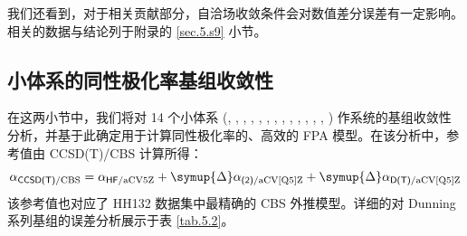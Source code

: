 我们还看到，对于相关贡献部分，自洽场收敛条件会对数值差分误差有一定影响。相关的数据与结论列于附录的 \ref{sec.5.s9} 小节。

\subsection{小体系的同性极化率基组收敛性}

在这两小节中，我们将对 14 个小体系 (, , , , , , , , , , , , , ) 作系统的基组收敛性分析，并基于此确定用于计算同性极化率的、高效的 FPA 模型。在该分析中，参考值由 CCSD(T)/CBS 计算所得：
\begin{equation*}
    \alpha_{\textsf{CCSD(T)}/\text{CBS}} = \alpha_{\textsf{HF}/\text{aCV5Z}} + \symup{\Delta} \alpha_{\textsf{(2)}/\text{aCV[Q5]Z}} + \symup{\Delta} \alpha_{\textsf{D(T)}/\text{aCV[Q5]Z}}
\end{equation*}
该参考值也对应了 HH132 数据集中最精确的 CBS 外推模型。详细的对 Dunning 系列基组的误差分析展示于表 \ref{tab.5.2}。

